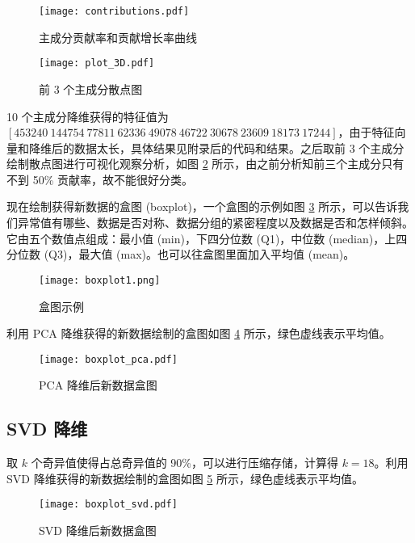 \documentclass[12pt,AutoFakeBold]{article}
\begin{document}
\begin{figure}[htbp]
	\centering
    \texttt{[image: contributions.pdf]}
    \caption{主成分贡献率和贡献增长率曲线} \label{fig:contributions}
\end{figure}

\begin{figure}[htbp]
	\centering
    \texttt{[image: plot\_3D.pdf]}
    \caption{前 3 个主成分散点图} \label{fig:plot_3D}
\end{figure}

10 个主成分降维获得的特征值为 $[453240\ 144754\ 77811\ 62336\ 49078\ 46722\ 30678\ 23609\ \allowbreak 18173\ 17244]$，由于特征向量和降维后的数据太长，具体结果见附录后的代码和结果。之后取前 3 个主成分绘制散点图进行可视化观察分析，如图 \ref{fig:plot_3D} 所示，由之前分析知前三个主成分只有不到 50\% 贡献率，故不能很好分类。

现在绘制获得新数据的盒图 (boxplot)，一个盒图的示例如图 \ref{fig:boxplot1} 所示，可以告诉我们异常值有哪些、数据是否对称、数据分组的紧密程度以及数据是否和怎样倾斜。它由五个数值点组成：最小值 (min)，下四分位数 (Q1)，中位数 (median)，上四分位数 (Q3)，最大值 (max)。也可以往盒图里面加入平均值 (mean)。

\begin{figure}[htbp]
	\centering
    \texttt{[image: boxplot1.png]}
    \caption{盒图示例} \label{fig:boxplot1}
\end{figure}

利用 PCA 降维获得的新数据绘制的盒图如图 \ref{fig:boxplot_pca} 所示，绿色虚线表示平均值。

\begin{figure}[htbp]
	\centering
    \texttt{[image: boxplot\_pca.pdf]}
    \caption{PCA 降维后新数据盒图} \label{fig:boxplot_pca}
\end{figure}

\subsection{SVD 降维}

取 $k$ 个奇异值使得占总奇异值的 90\%，可以进行压缩存储，计算得 $k=18$。利用 SVD 降维获得的新数据绘制的盒图如图 \ref{fig:boxplot_svd} 所示，绿色虚线表示平均值。

\begin{figure}[htbp]
	\centering
    \texttt{[image: boxplot\_svd.pdf]}
    \caption{SVD 降维后新数据盒图} \label{fig:boxplot_svd}
\end{figure}
\end{document}
